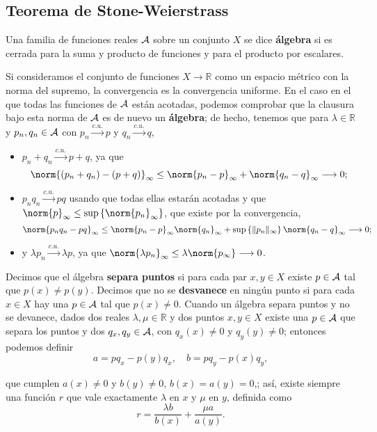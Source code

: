\documentclass[11pt]{article}
\theoremstyle{plain}
\theoremstyle{definition}
\theoremstyle{remark}
\begin{document}
\subsection{Teorema de Stone-Weierstrass}

Una familia de funciones reales ${\cal A}$ sobre un conjunto $X$ se dice
\textbf{álgebra} si es cerrada para la suma y producto de funciones y
para el producto por escalares. 

Si consideramos el conjunto de funciones $X \to \mathbb{R}$ como un
espacio métrico con la norma del supremo, la convergencia es la
convergencia uniforme. En el caso en el que todas las funciones
de ${\cal A}$ están acotadas, podemos comprobar que la clausura bajo esta
norma de ${\cal A}$ es de nuevo un \textbf{álgebra}; de hecho, tenemos que para
$\lambda \in \mathbb{R}$ y $p_n,q_n \in {\cal A}$ con $p_n \overset{c.u.}\longrightarrow p$ y $q_n \overset{c.u.}\longrightarrow q$,

\begin{itemize}
\item $p_n + q_n \overset{c.u.}\longrightarrow p + q$, ya que
   \[
   \norm{(p_n + q_n) - (p + q)}_{\infty} \leq
   \norm{p_n - p}_{\infty} + \norm{q_n - q}_{\infty} \longrightarrow 0;
   \]
\item $p_nq_n \overset{c.u.}\longrightarrow pq$ usando que todas ellas estarán acotadas y
      que $\norm{p}_{\infty} \leq \sup \left\{ \norm{p_n}_{\infty} \right\}$, que existe por la convergencia,
   \[
   \norm{p_nq_n - pq}_{\infty} \leq
   \norm{p_n - p}_{\infty}\norm{q_n}_\infty + 
   \sup \left\{ \|p_n\|_{\infty} \right\} \norm{q_n-q}_{\infty} \longrightarrow 0;
   \]
\item y $\lambda p_n \overset{c.u.}\longrightarrow \lambda p$, ya que $\norm{\lambda p_n}_{\infty} \leq \lambda\norm{p_{\infty}} \longrightarrow 0$.
\end{itemize}

Decimos que el álgebra \textbf{separa puntos} si para cada par $x,y \in X$
existe $p \in {\cal A}$ tal que $p(x) \neq p(y)$. Decimos que no se \textbf{desvanece}
en ningún punto si para cada $x \in X$ hay una $p \in {\cal A}$ tal que $p(x) \neq 0$.
Cuando un álgebra separa puntos y no se devanece, dados dos reales
$\lambda,\mu \in \mathbb{R}$ y dos puntos $x,y \in X$ existe una $p \in {\cal A}$ que separa
los puntos y dos $q_x,q_y \in {\cal A}$, con $q_x(x) \neq 0$ y $q_y(y) \neq 0$; entonces
podemos definir
\[
a = pq_x - p(y)q_x, \quad
b = pq_y - p(x)q_y, 
\]

que cumplen $a(x) \neq 0$ y $b(y) \neq 0$, $b(x) = a(y) = 0$,; así, existe
siempre una función $r$ que vale exactamente $\lambda$ en $x$ y $\mu$ en $y$,
definida como
\[
r = \frac{\lambda b}{b(x)} + \frac{\mu a}{a(y)}.
\]
\end{document}
